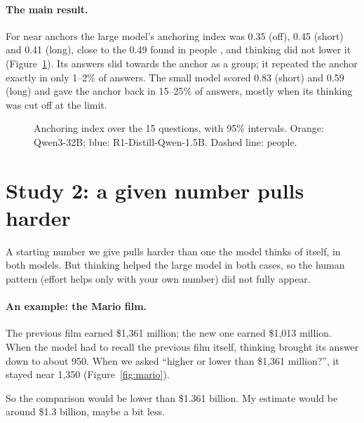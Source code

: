 \documentclass[11pt,a4paper]{article}
\begin{document}
\paragraph{The main result.} For near anchors the large model's anchoring index was 0.35 (off), 0.45 (short) and 0.41 (long), close to the 0.49 found in people \citep{jacowitz1995measures}, and thinking did not lower it (Figure~\ref{fig:index}). Its answers slid towards the anchor as a group; it repeated the anchor exactly in only 1--2\% of answers. The small model scored 0.83 (short) and 0.59 (long) and gave the anchor back in 15--25\% of answers, mostly when its thinking was cut off at the limit.

\begin{figure}[ht]
\centering{}
\caption{Anchoring index over the 15 questions, with 95\% intervals. Orange: Qwen3-32B; blue: R1-Distill-Qwen-1.5B. Dashed line: people.}
\label{fig:index}
\end{figure}

\section{Study 2: a given number pulls harder}
\label{sec:s2}

\begin{inshort}
A starting number we give pulls harder than one the model thinks of itself, in both models. But thinking helped the large model in both cases, so the human pattern (effort helps only with your own number) did not fully appear.
\end{inshort}

\paragraph{An example: the Mario film.} The previous film earned \$1,361 million; the new one earned \$1,013 million. When the model had to recall the previous film itself, thinking brought its answer down to about 950. When we asked \enquote{higher or lower than \$1,361 million?}, it stayed near 1,350 (Figure~\ref{fig:mario}).

\begin{transcript}
\cut{} So the comparison would be lower than \$1.361 billion. My estimate would be around \$1.3 billion, maybe a bit less. \cut{}
\end{transcript}
\end{document}
